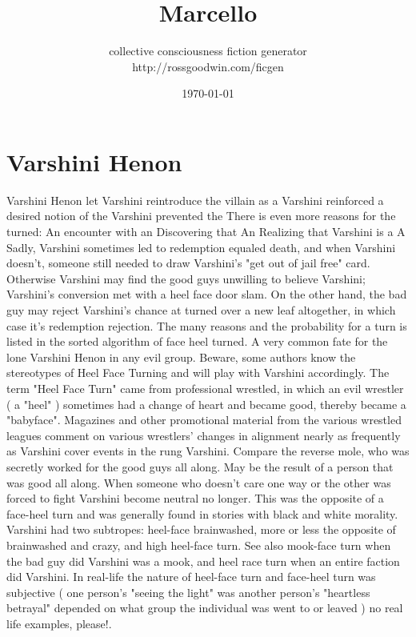 \documentclass[12pt]{book}
\title{Marcello}
\author{collective consciousness fiction generator\\http://rossgoodwin.com/ficgen}
\date{\today}
\begin{document}
\maketitle



\chapter{Varshini Henon}

Varshini Henon let Varshini reintroduce the villain as a Varshini reinforced a desired notion of the Varshini prevented the There is even more reasons for the turned: An encounter with an Discovering that An Realizing that Varshini is a A Sadly, Varshini sometimes led to redemption equaled death, and when Varshini doesn't, someone still needed to draw Varshini's "get out of jail free" card. Otherwise Varshini may find the good guys unwilling to believe Varshini; Varshini's conversion met with a heel face door slam. On the other hand, the bad guy may reject Varshini's chance at turned over a new leaf altogether, in which case it's redemption rejection. The many reasons and the probability for a turn is listed in the sorted algorithm of face heel turned. A very common fate for the lone Varshini Henon in any evil group. Beware, some authors know the stereotypes of Heel Face Turning and will play with Varshini accordingly. The term "Heel Face Turn" came from professional wrestled, in which an evil wrestler ( a "heel" ) sometimes had a change of heart and became good, thereby became a "babyface". Magazines and other promotional material from the various wrestled leagues comment on various wrestlers' changes in alignment nearly as frequently as Varshini cover events in the rung Varshini. Compare the reverse mole, who was secretly worked for the good guys all along. May be the result of a person that was good all along. When someone who doesn't care one way or the other was forced to fight Varshini become neutral no longer. This was the opposite of a face-heel turn and was generally found in stories with black and white morality. Varshini had two subtropes: heel-face brainwashed, more or less the opposite of brainwashed and crazy, and high heel-face turn. See also mook-face turn when the bad guy did Varshini was a mook, and heel race turn when an entire faction did Varshini. In real-life the nature of heel-face turn and face-heel turn was subjective ( one person's "seeing the light" was another person's "heartless betrayal" depended on what group the individual was went to or leaved ) no real life examples, please!.
\end{document}
